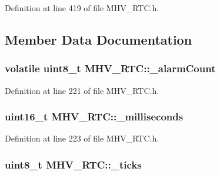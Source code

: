 \-Definition at line 419 of file \-M\-H\-V\-\_\-\-R\-T\-C.\-h.



\subsection{\-Member \-Data \-Documentation}
\hypertarget{class_m_h_v___r_t_c_a953a79952c9fa5fde5d1dacbc03d3b46}{
\subsubsection[{\-\_\-alarm\-Count}]{\setlength{\rightskip}{0pt plus 5cm}volatile uint8\-\_\-t {\bf \-M\-H\-V\-\_\-\-R\-T\-C\-::\-\_\-alarm\-Count}}}
\label{class_m_h_v___r_t_c_a953a79952c9fa5fde5d1dacbc03d3b46}


\-Definition at line 221 of file \-M\-H\-V\-\_\-\-R\-T\-C.\-h.

\hypertarget{class_m_h_v___r_t_c_acd3e486b5e5ee1d8cf9d961c0fdbde57}{
\subsubsection[{\-\_\-milliseconds}]{\setlength{\rightskip}{0pt plus 5cm}uint16\-\_\-t {\bf \-M\-H\-V\-\_\-\-R\-T\-C\-::\-\_\-milliseconds}}}
\label{class_m_h_v___r_t_c_acd3e486b5e5ee1d8cf9d961c0fdbde57}


\-Definition at line 223 of file \-M\-H\-V\-\_\-\-R\-T\-C.\-h.

\hypertarget{class_m_h_v___r_t_c_ab29c30f80f7234394299476c73f36baf}{
\subsubsection[{\-\_\-ticks}]{\setlength{\rightskip}{0pt plus 5cm}uint8\-\_\-t {\bf \-M\-H\-V\-\_\-\-R\-T\-C\-::\-\_\-ticks}}}
\label{class_m_h_v___r_t_c_ab29c30f80f7234394299476c73f36baf}


